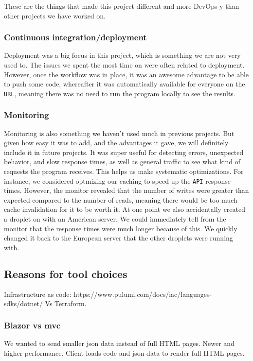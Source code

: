 These are the things that made this project different and more DevOps-y
than other projects we have worked on.

\subsubsection{Continuous integration/deployment}

Deployment was a big focus in this project, 
which is something we are not very used to.
The issues we spent the most time on were often related to deployment.
However, once the workflow was in place, it was
an awesome advantage to be able to push some code,
whereafter it was automatically available for everyone on the \texttt{URL}, 
meaning there was no need to run the program locally to see the results.

\subsubsection{Monitoring}

Monitoring is also something we haven't used much in previous projects.
But given how easy it was to add, and the advantages it gave,
we will definitely include it in future projects.
It was super useful for detecting errors, unexpected behavior,
and slow response times, as well as general traffic to see 
what kind of requests the program receives.
This helps us make systematic optimizations. For instance,
we considered optmizing our caching to speed up the \texttt{API} response times.
However, the monitor revealed that the number of writes were
greater than expected compared to the number of reads,
meaning there would be too much cache invalidation for it to be worth it.
At one point we also accidentally created a droplet on with an American server.
We could immediately tell from the monitor that the response 
times were much longer because of this.
We quickly changed it back to the European server 
that the other droplets were running with.

\subsection{Reasons for tool choices}

Infrastructure as code: https://www.pulumi.com/docs/iac/languages-sdks/dotnet/
Vs
Terraform.

\subsubsection{Blazor vs mvc}
We wanted to send smaller json data instead of full HTML pages. 
Newer and higher performance. Client loads code and json data 
to render full HTML pages.

